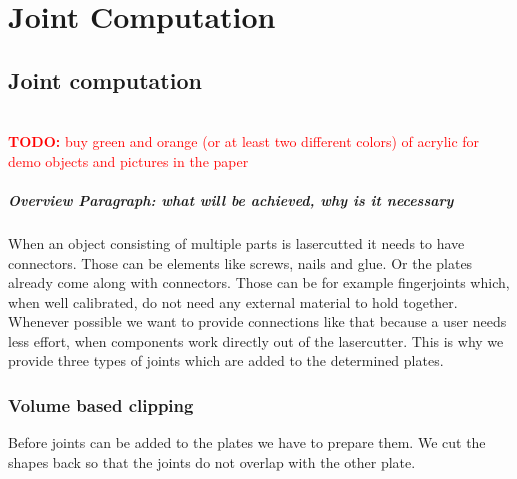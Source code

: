\documentclass[../ClassicThesis.tex]{subfiles}
\begin{document}
\chapter{Joint Computation}\label{ch:joints}
\newcommand{\TODO}[1]{\textcolor{red}{\\ \textbf{TODO:} #1 \\}}


\section{Joint computation}
\TODO{buy green and orange (or at least two different colors) of acrylic for demo objects and pictures in the paper}
\paragraph{Overview Paragraph: what will be achieved, why is it necessary}
When an object consisting of multiple parts is lasercutted it needs to have connectors. Those can be elements like screws, nails and glue. Or the plates already come along with connectors. Those can be for example fingerjoints which, when well calibrated, do not need any external material to hold together. \\
Whenever possible we want to provide connections like that because a user needs less effort, when components work directly out of the lasercutter. This is why we provide three types of joints which are added to the determined plates.

\subsection{Volume based clipping}
Before joints can be added to the plates we have to prepare them. We cut the shapes back so that the joints do not overlap with the other plate.
\end{document}
